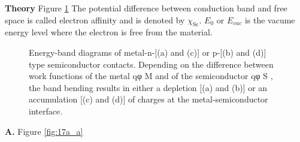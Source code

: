 \documentclass[main.tex]{subfiles}
\begin{document}
\begin{enumerate}
\begin{enumerate}
        \textbf{Theory} Figure \ref{fig:17t_a} The potential difference between conduction band and free space is called electron affinity and is denoted by $\chi_{\mathrm{Sc}}$. $E_0$ or $E_{vac}$ is the vacume energy level where the electron is free from the material.

        \begin{figure}
        \centering{}
        \caption{Energy-band diagrams of metal-n-[(a) and (c)] or p-[(b) and (d)] type semiconductor contacts. Depending on the difference between work functions of the metal qφ M and of the semiconductor qφ S , the band bending results in either a depletion [(a) and (b)] or an accumulation [(c) and (d)] of charges at the metal-semiconductor interface.}
        \label{fig:17t_a}
        \end{figure}
        
        \textbf{A.} Figure \ref{fig:17a_a} 


\end{enumerate}
\end{enumerate}
\end{document}
